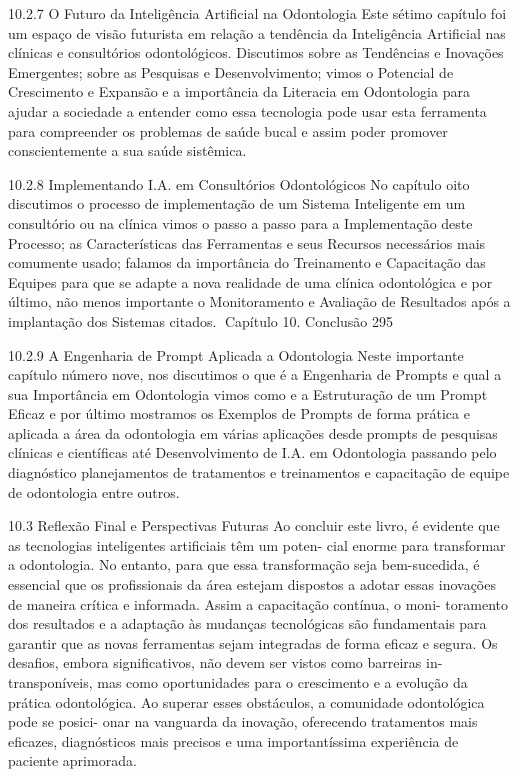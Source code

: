 10.2.7     O Futuro da Inteligência Artificial na Odontologia
Este sétimo capítulo foi um espaço de visão futurista em relação a tendência da
Inteligência Artificial nas clínicas e consultórios odontológicos. Discutimos sobre as
Tendências e Inovações Emergentes; sobre as Pesquisas e Desenvolvimento; vimos o
Potencial de Crescimento e Expansão e a importância da Literacia em Odontologia para
ajudar a sociedade a entender como essa tecnologia pode usar esta ferramenta para
compreender os problemas de saúde bucal e assim poder promover conscientemente
a sua saúde sistêmica.

10.2.8     Implementando I.A. em Consultórios Odontológicos
No capítulo oito discutimos o processo de implementação de um Sistema Inteligente
em um consultório ou na clínica vimos o passo a passo para a Implementação deste
Processo; as Características das Ferramentas e seus Recursos necessários mais
comumente usado; falamos da importância do Treinamento e Capacitação das Equipes
para que se adapte a nova realidade de uma clínica odontológica e por último, não
menos importante o Monitoramento e Avaliação de Resultados após a implantação dos
Sistemas citados.
Capítulo 10. Conclusão                                                                  295


10.2.9     A Engenharia de Prompt Aplicada a Odontologia
Neste importante capítulo número nove, nos discutimos o que é a Engenharia de
Prompts e qual a sua Importância em Odontologia vimos como e a Estruturação de
um Prompt Eficaz e por último mostramos os Exemplos de Prompts de forma prática
e aplicada a área da odontologia em várias aplicações desde prompts de pesquisas
clínicas e científicas até Desenvolvimento de I.A. em Odontologia passando pelo
diagnóstico planejamentos de tratamentos e treinamentos e capacitação de equipe de
odontologia entre outros.


10.3      Reflexão Final e Perspectivas Futuras
Ao concluir este livro, é evidente que as tecnologias inteligentes artificiais têm um poten-
cial enorme para transformar a odontologia. No entanto, para que essa transformação
seja bem-sucedida, é essencial que os profissionais da área estejam dispostos a adotar
essas inovações de maneira crítica e informada. Assim a capacitação contínua, o moni-
toramento dos resultados e a adaptação às mudanças tecnológicas são fundamentais
para garantir que as novas ferramentas sejam integradas de forma eficaz e segura.
        Os desafios, embora significativos, não devem ser vistos como barreiras in-
transponíveis, mas como oportunidades para o crescimento e a evolução da prática
odontológica. Ao superar esses obstáculos, a comunidade odontológica pode se posici-
onar na vanguarda da inovação, oferecendo tratamentos mais eficazes, diagnósticos
mais precisos e uma importantíssima experiência de paciente aprimorada.


